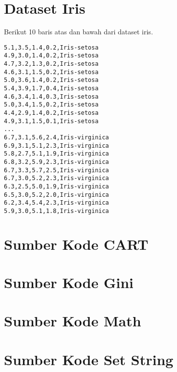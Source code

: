 \newpage
\section{Dataset Iris}
\label{appendix:dataset_iris}

Berikut 10 baris atas dan bawah dari dataset iris.

\begin{lstlisting}
5.1,3.5,1.4,0.2,Iris-setosa
4.9,3.0,1.4,0.2,Iris-setosa
4.7,3.2,1.3,0.2,Iris-setosa
4.6,3.1,1.5,0.2,Iris-setosa
5.0,3.6,1.4,0.2,Iris-setosa
5.4,3.9,1.7,0.4,Iris-setosa
4.6,3.4,1.4,0.3,Iris-setosa
5.0,3.4,1.5,0.2,Iris-setosa
4.4,2.9,1.4,0.2,Iris-setosa
4.9,3.1,1.5,0.1,Iris-setosa
...
6.7,3.1,5.6,2.4,Iris-virginica
6.9,3.1,5.1,2.3,Iris-virginica
5.8,2.7,5.1,1.9,Iris-virginica
6.8,3.2,5.9,2.3,Iris-virginica
6.7,3.3,5.7,2.5,Iris-virginica
6.7,3.0,5.2,2.3,Iris-virginica
6.3,2.5,5.0,1.9,Iris-virginica
6.5,3.0,5.2,2.0,Iris-virginica
6.2,3.4,5.4,2.3,Iris-virginica
5.9,3.0,5.1,1.8,Iris-virginica
\end{lstlisting}

\newpage
\section{Sumber Kode CART}
\label{appendix:sumber_kode_cart}


\newpage
\section{Sumber Kode Gini}
\label{appendix:sumber_kode_gini}


\newpage
\section{Sumber Kode Math}
\label{appendix:sumber_kode_math}


\newpage
\section{Sumber Kode Set String}
\label{appendix:sumber_kode_setstring}


